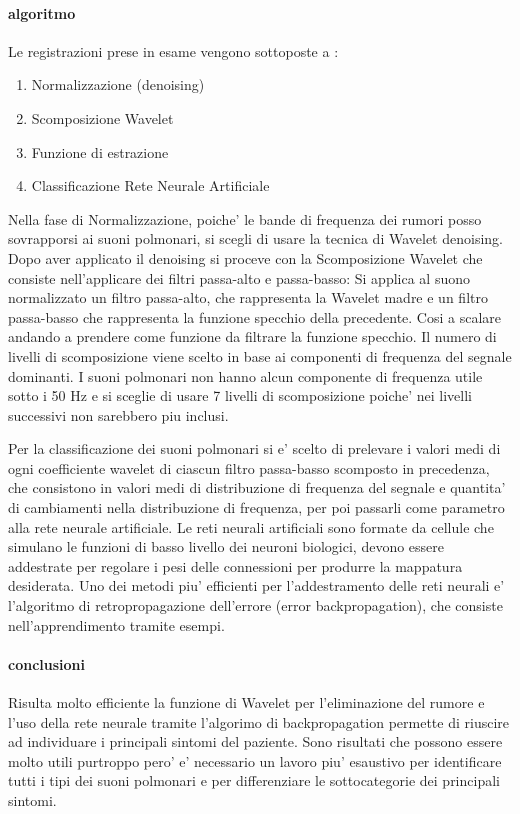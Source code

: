 \paragraph{algoritmo}

Le registrazioni prese in esame vengono sottoposte a :
\begin{enumerate}
      \item 
      Normalizzazione (denoising)
      \item
      Scomposizione Wavelet
      \item
      Funzione di estrazione
      \item
      Classificazione Rete Neurale Artificiale
\end{enumerate} 

Nella fase di Normalizzazione, poiche' le bande di frequenza dei rumori posso sovrapporsi ai suoni polmonari, 
si scegli di usare la tecnica di Wavelet denoising.
Dopo aver applicato il denoising si proceve con la Scomposizione Wavelet che consiste nell'applicare dei filtri passa-alto e passa-basso:
Si applica al suono normalizzato un filtro passa-alto, che rappresenta la Wavelet madre e un filtro passa-basso che rappresenta la funzione 
specchio della precedente. Cosi a scalare andando a prendere come funzione da filtrare la funzione specchio.
Il numero di livelli di scomposizione viene scelto in base ai componenti di frequenza del segnale dominanti.
I suoni polmonari non hanno alcun componente di frequenza utile sotto i 50 Hz e si sceglie di usare 7 livelli di scomposizione poiche' nei livelli
successivi non sarebbero piu inclusi.

Per la classificazione dei suoni polmonari si e' scelto di prelevare i valori medi di ogni coefficiente wavelet di ciascun filtro passa-basso 
scomposto in precedenza, che consistono in valori medi di distribuzione di frequenza del segnale e quantita' di cambiamenti nella distribuzione di frequenza,
per poi passarli come parametro alla rete neurale artificiale.
Le reti neurali artificiali sono formate da cellule che simulano le funzioni di basso livello dei neuroni biologici, 
devono essere addestrate per regolare i pesi delle connessioni per produrre la mappatura desiderata.
Uno dei metodi piu' efficienti per l'addestramento delle reti neurali e' l'algoritmo di retropropagazione dell'errore (error backpropagation),
che consiste nell'apprendimento tramite esempi.

\paragraph{conclusioni}
Risulta molto efficiente la funzione di Wavelet per l'eliminazione del rumore e l'uso della rete neurale tramite l'algorimo di backpropagation permette di
riuscire ad individuare i principali sintomi del paziente.
Sono risultati che possono essere molto utili purtroppo pero' e' necessario un lavoro piu' esaustivo per identificare tutti i tipi dei suoni polmonari e 
per differenziare le sottocategorie dei principali sintomi. 


